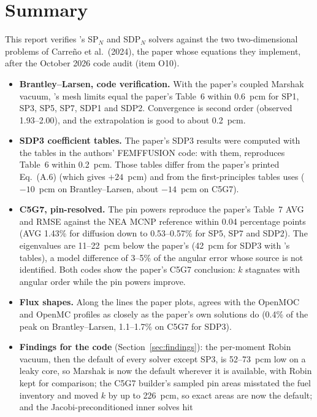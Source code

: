 \section*{Summary}

This report verifies \garnet's SP$_N$ and SDP$_N$ solvers against the two
two-dimensional problems of Carre\~no et al.\ (2024), the paper whose
equations they implement, after the October 2026 code audit (item O10).

\begin{itemize}
\item \textbf{Brantley--Larsen, code verification.} With the paper's coupled
  Marshak vacuum, \garnet's mesh limits equal the paper's Table~6 within
  0.6~pcm for SP1, SP3, SP5, SP7, SDP1 and SDP2. Convergence is second order
  (observed 1.93--2.00), and the extrapolation is good to about 0.2~pcm.
\item \textbf{SDP3 coefficient tables.} The paper's SDP3 results were
  computed with the tables in the authors' FEMFFUSION code: with them,
  \garnet{} reproduces Table~6 within 0.2~pcm. Those tables differ from the
  paper's printed Eq.~(A.6) (which gives $+24$~pcm) and from the
  first-principles tables \garnet{} uses ($-10$~pcm on Brantley--Larsen,
  about $-14$~pcm on C5G7).
\item \textbf{C5G7, pin-resolved.} The pin powers reproduce the paper's
  Table~7 AVG and RMSE against the NEA MCNP reference within 0.04
  percentage points (AVG 1.43\% for diffusion down to 0.53--0.57\% for SP5,
  SP7 and SDP2). The eigenvalues are 11--22~pcm below the paper's (42~pcm
  for SDP3 with \garnet's tables), a model difference of 3--5\% of the
  angular error whose source is not identified. Both codes
  show the paper's C5G7 conclusion: $k$ stagnates with angular order while
  the pin powers improve.
\item \textbf{Flux shapes.} Along the lines the paper plots, \garnet{} agrees
  with the OpenMOC and OpenMC profiles as closely as the paper's own
  solutions do (0.4\% of the peak on Brantley--Larsen, 1.1--1.7\% on C5G7
  for SDP3).
\item \textbf{Findings for the code} (Section~\ref{sec:findings}): the
  per-moment Robin vacuum, then the default of every solver except SP3, is
  52--73~pcm low on a leaky core, so Marshak is now the default wherever it is
  available, with Robin kept for comparison; the C5G7 builder's sampled pin
  areas misstated the fuel inventory and moved $k$ by up to 226~pcm, so exact
  areas are now the default; and the Jacobi-preconditioned inner solves hit

\end{itemize}
